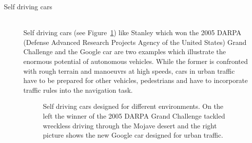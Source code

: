 \begin{description}
\item[Self driving cars]\hfill \\
Self driving cars (see Figure~\ref{fig:fig_auto}) like Stanley \cite{stanley} which won the 2005 DARPA (Defense Advanced Research Projects Agency of the United States) Grand Challenge and the Google car \cite{guizzo2011google} are two examples which illustrate the enormous potential of autonomous vehicles.
While the former is confronted with rough terrain and manoeuvrs at high speeds, cars in urban traffic have to be prepared for other vehicles, pedestrians and have to incorporate traffic rules into the navigation task. 

\begin{figure}[thpb]
	  \myfloatalign
      \footnotesize
      \centering
   \caption[Selfdriving car]{Self driving cars designed for different environments. On the left the winner of the 2005 DARPA Grand Challenge tackled wreckless driving through the Mojave desert and the right picture shows the new Google car designed for urban traffic.}
   \label{fig:fig_auto}
\end{figure}


\end{description}
